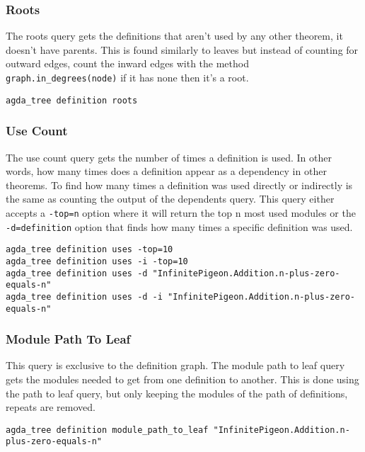 \subsubsection{Roots}

The roots query gets the definitions that aren't used by any other theorem, it
doesn't have parents. This is found similarly to leaves but instead of counting
for outward edges, count the inward edges with the method \linebreak
\texttt{graph.in\_degrees(node)} if it has none then it's a root.

\begin{lstlisting}
agda_tree definition roots
\end{lstlisting}

\subsubsection{Use Count}

The use count query gets the number of times a definition is used. In other
words, how many times does a definition appear as a dependency in other
theorems. To find how many times a definition was used directly or indirectly
is the same as counting the output of the dependents query. This query either
accepts a \texttt{-top=n} option where it will return the top n most used
modules or the \texttt{-d=definition} option that finds how many times a
specific definition was used.

\begin{lstlisting}
agda_tree definition uses -top=10
agda_tree definition uses -i -top=10
agda_tree definition uses -d "InfinitePigeon.Addition.n-plus-zero-equals-n"
agda_tree definition uses -d -i "InfinitePigeon.Addition.n-plus-zero-equals-n"
\end{lstlisting}

\subsubsection{Module Path To Leaf}

This query is exclusive to the definition graph. The module path to leaf query
gets the modules needed to get from one definition to another. This is done
using the path to leaf query, but only keeping the modules of the path of
definitions, repeats are removed.

\begin{lstlisting}
agda_tree definition module_path_to_leaf "InfinitePigeon.Addition.n-plus-zero-equals-n"
\end{lstlisting}

